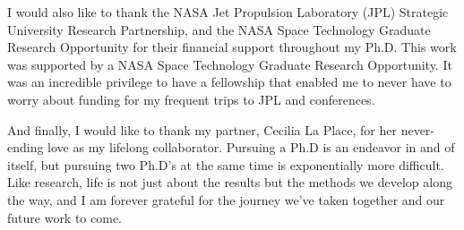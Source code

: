 I would also like to thank the NASA Jet Propulsion Laboratory (JPL) Strategic University Research Partnership, and the NASA Space Technology Graduate Research Opportunity for their financial support throughout my Ph.D. 
This work was supported by a NASA Space Technology Graduate Research Opportunity. 
It was an incredible privilege to have a fellowship that enabled me to never have to worry about funding for my frequent trips to JPL and conferences.

And finally, I would like to thank my partner, Cecilia La Place, for her never-ending love as my lifelong collaborator. 
Pursuing a Ph.D is an endeavor in and of itself, but pursuing two Ph.D's at the same time is exponentially more difficult.
Like research, life is not just about the results but the methods we develop along the way, and I am forever grateful for the journey we've taken together and our future work to come.